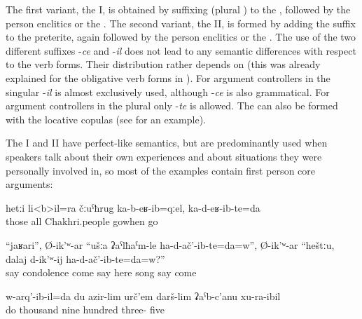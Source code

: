 The first variant, the  I, is obtained by suffixing  (plural ) to the , followed by the person enclitics or the  . The second variant, the  II, is formed by adding the suffix  to the preterite, again followed by the person enclitics or the . The use of the two different suffixes -\textit{ce} and -\textit{il} does not lead to any semantic differences with respect to the  verb forms. Their distribution rather depends on  (this was already explained for the obligative verb forms in ). For argument controllers in the singular -\textit{il} is almost exclusively used, although -\textit{ce} is also grammatical. For argument controllers in the plural only -\textit{te} is allowed. The  can also be formed with the locative copulas (see  for an example).

The  I and II have perfect-like semantics, but are predominantly used when speakers talk about their own experiences and about situations they were personally involved in, so most of the examples contain first person core arguments:
%
\begin{exe}
	\ex	\label{ex:‎When all Chakhri people moved to the lowlands, we (also) moved}
	\gll	hetːi	li<b>il=ra	čːuˁħrug	ka-b-eʁ-ib=qːel,	ka-d-eʁ-ib-te=da	\\
		those	all	Chakhri.people	gowhen	go\\
	\glt	{}

	\ex	\label{ex:Then Abdulkhalik says, have you come here for making condolence or for singing songs}
	\gll	``jaʁari'',	Ø-ik'ʷ-ar	``ušːa	ʡaˁlħaˁm-le	ha-d-ač'-ib-te=da=w'',	Ø-ik'ʷ-ar	``heštːu,		dalaj	d-ik'ʷ-ij	ha-d-ač'-ib-te=da=w?''\\
			say		condolence	come	say	here		song	say	come\\
	\glt	{}

	\ex	\label{ex:‎‎‎I was born in 1935 analytic}
	\gll	w-arq'-ib-il=da	du	azir-lim	urč'em	darš-lim	ʡaˁb-c'anu	xu-ra-ibil\\
		do		thousand	nine	hundred	three-	five\\
	\glt	{}
\end{exe}

